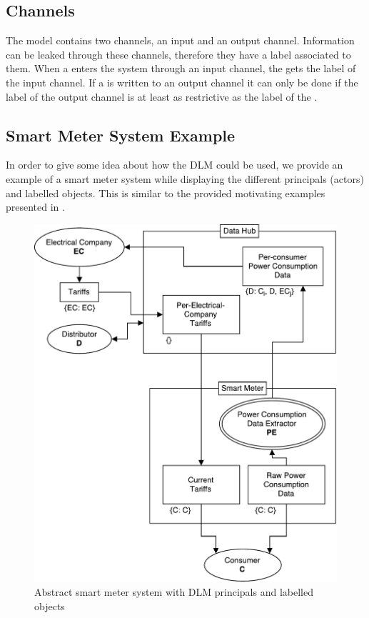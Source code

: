\subsection{Channels}
The model contains two channels, an input and an output channel.
Information can be leaked through these channels, therefore they have a label associated to them.
When a \xvalue{} enters the system through an input channel, the \xvalue{} gets the label of the input channel.
If a \xvalue{} is written to an output channel it can only be done if the label of the output channel is at least as restrictive as the label of the \xvalue{}.

\subsection{Smart Meter System Example}\label{dlm-example}
In order to give some idea about how the DLM could be used, we provide an example of a smart meter system while displaying the different principals (actors) and labelled objects.
This is similar to the provided motivating examples presented in \citet{myers1997decentralized}.

\begin{figure}[h]
\centering
\includegraphics[width=\textwidth]{figures/dlm_sm_example.pdf}
\caption{Abstract smart meter system with DLM principals and labelled objects}
\label{dlm:sm_example}
\end{figure}

